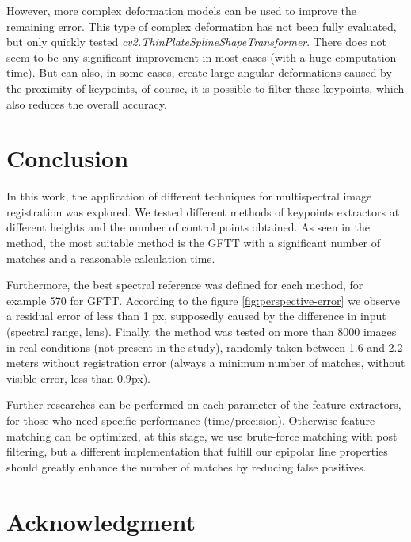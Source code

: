 \documentclass[]{elsarticle}
\begin{document}
	However, more complex deformation models \cite{10.1007/978-3-642-3-3-33709-3_3} can be used to improve the remaining error.
	This type of complex deformation has not been fully evaluated, but only quickly tested \textit{cv2.ThinPlateSplineShapeTransformer}.
	There does not seem to be any significant improvement in most cases (with a huge computation time).
	But can also, in some cases, create large angular deformations caused by the proximity of keypoints,
	of course, it is possible to filter these keypoints, which also reduces the overall accuracy.
	
	
	\section{Conclusion}
	
	In this work, the application of different techniques for multispectral image registration was explored.
	We tested different methods of keypoints extractors at different heights and the number of control points obtained.
	As seen in the method, the most suitable method is the GFTT with a significant number of matches and a reasonable calculation time.
	
	Furthermore, the best spectral reference was defined for each method, for example 570 for GFTT.
	According to the figure \ref{fig:perspective-error} we observe a residual error of less than 1 px,
	supposedly caused by the difference in input (spectral range, lens).
	Finally, the method was tested on more than 8000 images in real conditions (not present in the study),
	randomly taken between 1.6 and 2.2 meters without registration error (always a minimum number of matches, without visible error, less than $0.9$px).
	\\
	\par Further researches can be performed on each parameter of the feature extractors, for those who need specific performance (time/precision).
	Otherwise feature matching can be optimized, at this stage, we use brute-force matching with post filtering,
	but a different implementation that fulfill our epipolar line properties should greatly enhance the number of matches by reducing false positives.
	
	\newpage
	
	\section{Acknowledgment}
	
\end{document}

